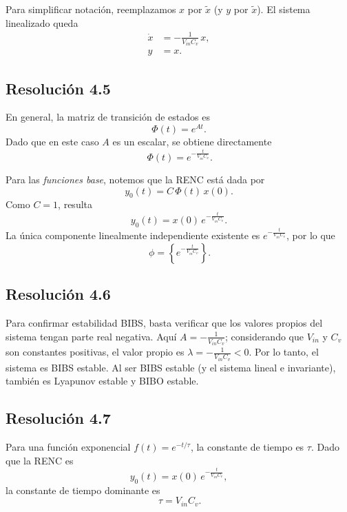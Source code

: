 \documentclass[
  11pt,
  letterpaper,
   addpoints,
  answers
  ]{exam}
\begin{document}
\begin{questions}
\begin{solution}
Para simplificar notación, reemplazamos $x$ por $\tilde{x}$ (y $y$ por $\tilde{x}$). El sistema linealizado queda
\begin{align}
\dot{x}&=-\frac{1}{V_{in}C_v}\,x,\\
y&=x.
\end{align}

\subsection*{Resolución 4.5}

En general, la matriz de transición de estados es
\begin{equation}
\Phi(t)=e^{At}.
\end{equation}
Dado que en este caso $A$ es un escalar, se obtiene directamente
\begin{equation}
\boxed{\,\Phi(t)=e^{-\frac{t}{V_{in}C_v}}.}
\end{equation}

Para las \emph{funciones base}, notemos que la RENC está dada por
\begin{equation}
y_{0}(t)=C\,\Phi(t)\,x(0).
\end{equation}
Como $C=1$, resulta
\begin{equation}
y_{0}(t)=x(0)\,e^{-\frac{t}{V_{in}C_v}}.
\end{equation}
La única componente linealmente independiente existente es $e^{-\frac{t}{V_{in}C_v}}$, por lo que
\begin{equation}
\boxed{\,\phi=\left\{e^{-\frac{t}{V_{in}C_v}}\right\}.}
\end{equation}

\subsection*{Resolución 4.6}

Para confirmar estabilidad BIBS, basta verificar que los valores propios del sistema tengan parte real negativa. Aquí $A=-\frac{1}{V_{in}C_v}$; considerando que $V_{in}$ y $C_v$ son constantes positivas, el valor propio es $\lambda=-\frac{1}{V_{in}C_v}<0$. Por lo tanto, el sistema es BIBS estable. Al ser BIBS estable (y el sistema lineal e invariante), también es Lyapunov estable y BIBO estable.

\subsection*{Resolución 4.7}

Para una función exponencial $f(t)=e^{-t/\tau}$, la constante de tiempo es $\tau$. Dado que la RENC es
\begin{equation}
y_{0}(t)=x(0)\,e^{-\frac{t}{V_{in}C_v}},
\end{equation}
la constante de tiempo dominante es
\begin{equation}
\boxed{\,\tau=V_{in}C_v.}
\end{equation}


\end{solution}
\end{questions}
\end{document}
